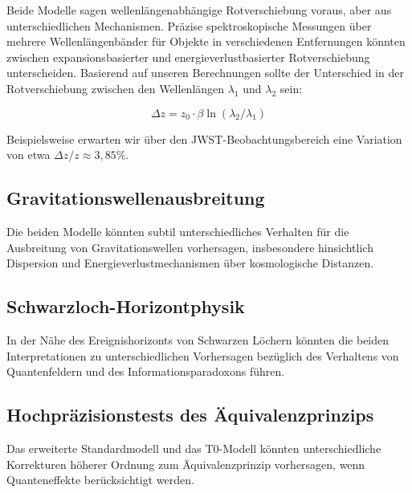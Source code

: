 \documentclass[12pt,a4paper]{article}
\begin{document}
	Beide Modelle sagen wellenlängenabhängige Rotverschiebung voraus, aber aus unterschiedlichen Mechanismen\cite{pascher_messdifferenzen_2025}. Präzise spektroskopische Messungen über mehrere Wellenlängenbänder für Objekte in verschiedenen Entfernungen könnten zwischen expansionsbasierter und energieverlustbasierter Rotverschiebung unterscheiden. Basierend auf unseren Berechnungen sollte der Unterschied in der Rotverschiebung zwischen den Wellenlängen $\lambda_1$ und $\lambda_2$ sein:
	
	\begin{equation}
		\label{eq:delta_z}
		\Delta z = z_0 \cdot \beta \ln(\lambda_2/\lambda_1)
	\end{equation}
	
	Beispielsweise erwarten wir über den JWST-Beobachtungsbereich eine Variation von etwa $\Delta z / z \approx 3,85\%$\cite{pascher_messdifferenzen_2025}.
	
	\subsection{Gravitationswellenausbreitung}
	\label{subsec:grav_wave_tests}
	
	Die beiden Modelle könnten subtil unterschiedliches Verhalten für die Ausbreitung von Gravitationswellen vorhersagen\cite{pascher_emergente_gravitation_2025}, insbesondere hinsichtlich Dispersion und Energieverlustmechanismen über kosmologische Distanzen\cite{abbott2016}.
	
	\subsection{Schwarzloch-Horizontphysik}
	\label{subsec:black_hole_tests}
	
	In der Nähe des Ereignishorizonts von Schwarzen Löchern könnten die beiden Interpretationen zu unterschiedlichen Vorhersagen bezüglich des Verhaltens von Quantenfeldern und des Informationsparadoxons führen\cite{hawking1975, pascher_emergente_gravitation_2025}.
	
	\subsection{Hochpräzisionstests des Äquivalenzprinzips}
	\label{subsec:equivalence_tests}
	
	Das erweiterte Standardmodell und das T0-Modell könnten unterschiedliche Korrekturen höherer Ordnung zum Äquivalenzprinzip vorhersagen, wenn Quanteneffekte berücksichtigt werden\cite{pascher_feldtheorie_2025, will2014}.
	
\end{document}
